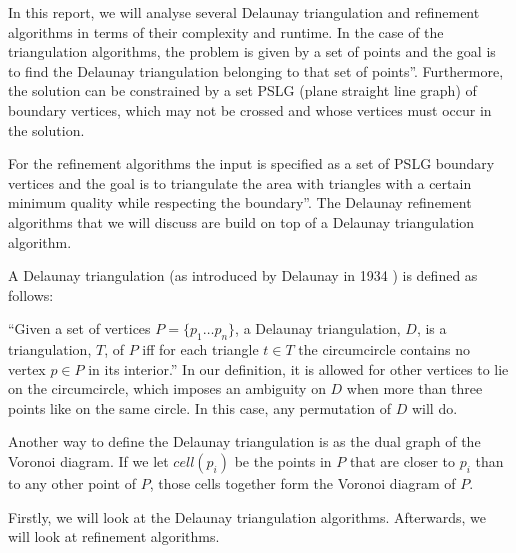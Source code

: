 In this report, we will analyse several Delaunay triangulation and refinement algorithms
in terms of their complexity and runtime.
In the case of the triangulation algorithms, the problem is given by a set of points and the goal is to find the Delaunay triangulation belonging to that set of points''.
Furthermore, the solution can be constrained by a set PSLG (plane straight line graph) of
boundary vertices, which may not be crossed and whose vertices must occur in the solution.

For the refinement algorithms the input is specified as a set of PSLG boundary vertices and
the goal is to triangulate the area with triangles with a certain minimum quality while respecting the boundary''.
The Delaunay refinement algorithms that we will discuss are build on top of a Delaunay triangulation algorithm.

A Delaunay triangulation (as introduced by Delaunay in 1934 \cite{art:Delaunay1934}) is defined as follows:

``Given a set of vertices $P = \{p_1 \ldots p_n\}$, a Delaunay triangulation, $D$, is a triangulation, $T$, of $P$
iff for each triangle $t \in T$ the circumcircle contains no vertex $p \in P$ in its interior.''
In our definition, it is allowed for other vertices to lie on the circumcircle, which imposes an ambiguity on $D$
when more than three points like on the same circle. In this case, any permutation of $D$ will do.

Another way to define the Delaunay triangulation is as the dual graph of the Voronoi diagram.
If we let $cell(p_i)$ be the points in $P$ that are closer to $p_i$ than to any other point of $P$,
those cells together form the Voronoi diagram of $P$.

Firstly, we will look at the Delaunay triangulation algorithms.
Afterwards, we will look at refinement algorithms.


